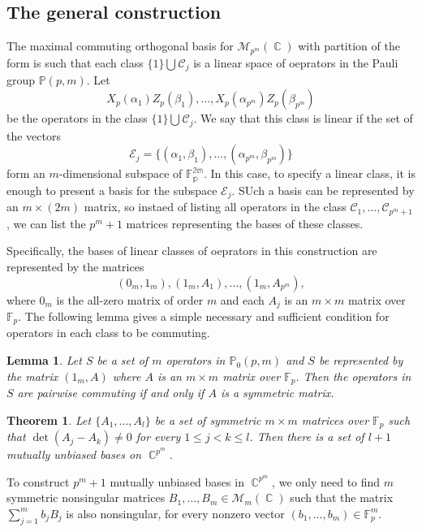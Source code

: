 \documentclass[a4paper]{article}
\DeclareMathOperator{\C}{\mathbb{C}}
\newtheorem{theorem}{Theorem}
\newtheorem{lemma}{Lemma}
\begin{document}
  \subsection{The general construction}

  The maximal commuting orthogonal basis for
  $\mathcal{M}_{p^{m}}(\C)$ with partition of the form is
  such that each class $\{1\} \bigcup_{} \mathcal{C}_j$ is a
  linear space of oeprators in the Pauli group $\mathbb
  P(p,m)$. Let
  \[
    X_p(\alpha_1)Z_p(\beta_1), \ldots,
    X_p(\alpha_{p^{m}})Z_p(\beta_{p^{m}})
  \] 
  be the operators in the class $\{1\} \bigcup_{}
  \mathcal{C}_j$. We say that this class is linear if the
  set of the vectors
  \[
    \mathcal{E}_{j}
    =
    \{(\alpha_1,\beta_1),\ldots,(\alpha_{p^{m}},\beta_{p^{m}})\}
  \] 
  form an $m$-dimensional subspace of $\mathbb{F_p^{2m}}$.
  In this case, to specify a linear class, it is enough to
  present a basis for the subspace $\mathcal{E}_j$. SUch a
  basis can be represented by an $m \times (2m)$ matrix, so
  instaed of listing all operators in the class
  $\mathcal{C}_1,\ldots,\mathcal{C}_{p^{m}+1}$, we can list
  the $p^{m}+1$ matrices representing the bases of these
  classes.

  Specifically, the bases of linear classes of oeprators in
  this construction are represented by the matrices
  \[
    (0_m, 1_m), (1_m,A_1), \ldots, (1_m,A_{p^{m}}),
  \] 
  where $0_m$ is the all-zero matrix of order $m$ and each
  $A_j$ is an $m \times m$ matrix over $\mathbb{F}_p$. The
  following lemma gives a simple necessary and sufficient
  condition for operators in each class to be commuting.

  \begin{lemma}
    Let $S$ be a set of $m$ operators in $\mathbb{P}_0(p,m)$ 
    and $S$ be represented by the matrix $(1_m,A)$ where $A$ 
    is an $m \times m$ matrix over $\mathbb{F}_p$. Then the
    operators in $S$ are pairwise commuting if and only if
    $A$ is a symmetric matrix.
  \end{lemma}

  \begin{theorem}
    Let $\{A_1,\ldots,A_l\}$ be a set of symmetric $m \times
    m$ matrices over $\mathbb{F}_p$ such that $\det(A_j-A_k)
    \neq 0$ for every $1 \leq j < k \leq l$. Then there is a
    set of $l+1$ mutually unbiased bases on $\C^{p^{m}}$.
  \end{theorem}

  To construct $p^{m}+1$ mutually unbiased bases in
  $\C^{p^{m}}$, we only need to find $m$ symmetric
  nonsingular matrices $B_1,\ldots,B_m \in
  \mathcal{M}_m(\C)$ such that the matrix $\sum_{j=1}^{m}
  b_j B_j$ is also nonsingular, for every nonzero vector
  $(b_1,\ldots,b_m) \in \mathbb{F}_p^{m}$. 
\end{document}
